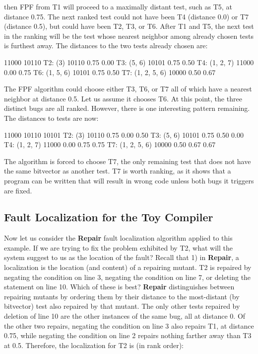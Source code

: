 \noindent then FPF from T1 will proceed to a maximally distant
test, such as T5, at distance 0.75.  The next ranked test could not have
been T4 (distance 0.0) or T7 (distance 0.5), but could have
been T2, T3, or T6.  After T1 and T5, the next test in the ranking will be the test whose nearest
neighbor among already chosen tests is furthest away.  The distances
to the two tests already chosen are:

{\scriptsize
\begin{code}
                         11000  10110
T2: (3)          10110   0.75   0.00
T3: (5, 6)       10101   0.75   0.50
T4: (1, 2, 7)    11000   0.00   0.75
T6: (1, 5, 6)    10101   0.75   0.50
T7: (1, 2, 5, 6) 10000   0.50   0.67
\end{code}
}

\noindent The FPF algorithm could choose either T3, T6, or T7 all of
which have a nearest neighbor at distance 0.5.  Let
us assume it chooses T6.  At this point, the three distinct bugs
are all ranked.  However, there is one interesting pattern remaining.
The distances to tests are now:

{\scriptsize
\begin{code}
                         11000  10110  10101
T2: (3)          10110   0.75   0.00   0.50
T3: (5, 6)       10101   0.75   0.50   0.00
T4: (1, 2, 7)    11000   0.00   0.75   0.75
T7: (1, 2, 5, 6) 10000   0.50   0.67   0.67
\end{code}
}

\noindent The algorithm is forced to choose T7, the only remaining
test that does not have the same bitvector as another test.  T7 is
worth ranking, as it shows that a program can be written that will
result in wrong code unless both bugs it triggers are fixed.

\subsection{Fault Localization for the Toy Compiler}

Now let us consider the {\bf Repair} fault localization algorithm
applied to this example.  If we are trying to fix the problem
exhibited by T2, what will the system suggest to us as the
location of the fault?  Recall that 1) in {\bf Repair}, a localization
is the location (and content) of a repairing mutant.  T2 is repaired
by negating the condition on line 3, negating the condition on line 7,
or deleting the statement on line 10.  Which of these is best?  {\bf
  Repair} distinguishes between repairing mutants by ordering them by
their distance to the most-distant (by bitvector) test also repaired
by that mutant.  The only other tests repaired by deletion of line 10
are the other instances of the same bug, all at distance 0.  Of the
other two repairs, negating the condition on line 3 also repairs T1,
at distance 0.75, while negating the condition on line 2 repairs
nothing farther away than T3 at 0.5.
Therefore, the localization for T2 is (in rank order):

